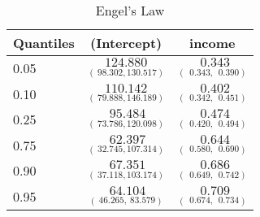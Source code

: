 %
\begin{table}[hptb]
\caption{Engel's Law\label{fit2}}
\begin{center}
\begin{tabular}{|l||c|c|} \hline
\multicolumn{1}{|l||}{Quantiles}&\multicolumn{1}{c|}{(Intercept)}&\multicolumn{1}{c|}{income}\\ \hline
0.05&$\underset{(~98.302,130.517)}{124.880}$&$\underset{(~~0.343,~~0.390)}{~~0.343}$\\ 
0.10&$\underset{(~79.888,146.189)}{110.142}$&$\underset{(~~0.342,~~0.451)}{~~0.402}$\\ 
0.25&$\underset{(~73.786,120.098)}{~95.484}$&$\underset{(~~0.420,~~0.494)}{~~0.474}$\\ 
0.75&$\underset{(~32.745,107.314)}{~62.397}$&$\underset{(~~0.580,~~0.690)}{~~0.644}$\\ 
0.90&$\underset{(~37.118,103.174)}{~67.351}$&$\underset{(~~0.649,~~0.742)}{~~0.686}$\\ 
0.95&$\underset{(~46.265,~83.579)}{~64.104}$&$\underset{(~~0.674,~~0.734)}{~~0.709}$\\ 
\hline
\end{tabular}
\vspace{3mm}
\end{center}
\end{table}
